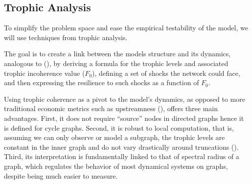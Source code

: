 \documentclass[american]{scrartcl}
\begin{document}

\subsection{Trophic Analysis}

To simplify the problem space and ease the empirical testability of the model, we will use techniques from trophic analysis.

The goal is to create a link between the models structure and its dynamics, analogous to \citeauthor{MacKay2020} (\citeyear[p.~19]{MacKay2020}), by deriving a formula for the trophic levels and associated trophic incoherence value ($F_0$), defining a set of shocks the network could face, and then expressing the resilience to such shocks as a function of $F_0$.

Using trophic coherence as a pivot to the model's dynamics, as opposed to more traditional economic metrics such as upstreamness (\cite{Antrs2012}), offers three main advantages. First, it does not require ``source'' nodes in directed graphs hence it is defined for cycle graphs. Second, it is robust to local computation, that is, assuming we can only observe or model a subgraph, the trophic levels are constant in the inner graph and do not vary drastically around truncations (\cite[p.~19]{MacKay2020}). Third, its interpretation is fundamentally linked to that of spectral radius of a graph, which regulates the behavior of most dynamical systems on graphs, despite being much easier to measure. %
\end{document}
